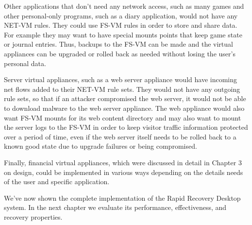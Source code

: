 Other applications that don't need any network access, such as many games and other personal-only programs, such as a diary application, would not have any NET-VM rules. They could use FS-VM rules in order to store and share data. For example they may want to have special mounts points that keep game state or journal entries. Thus, backups to the FS-VM can be made and the virtual appliances can be upgraded or rolled back as needed without losing the user's personal data.

Server virtual appliances, such as a web server appliance would have incoming net flows added to their NET-VM rule sets. They would not have any outgoing rule sets, so that if an attacker compromised the web server, it would not be able to download malware to the web server appliance. The web appliance would also want FS-VM mounts for its web content directory and may also want to mount the server logs to the FS-VM in order to keep visitor traffic information protected over a period of time, even if the web server itself needs to be rolled back to a known good state due to upgrade failures or being compromised.

Finally, financial virtual appliances, which were discussed in detail in Chapter 3 on design, could be implemented in various ways depending on the details needs of the user and specific application.

We've now shown the complete implementation of the Rapid Recovery Desktop system. In the next chapter we evaluate its performance, effectiveness, and recovery properties.

